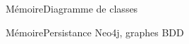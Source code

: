 \begin{frame}{Mémoire}{Diagramme de classes}

\end{frame}

\begin{frame}{Mémoire}{Persistance}
Neo4j, graphes BDD
\end{frame}